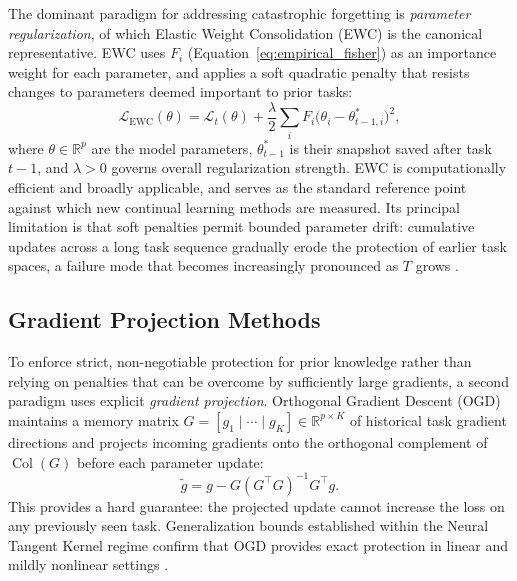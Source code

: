 The dominant paradigm for addressing catastrophic forgetting is
\emph{parameter regularization}, of which Elastic Weight Consolidation (EWC)
\citep{kirkpatrick_overcoming_2017} is the canonical representative.
EWC uses $F_i$ (Equation~\ref{eq:empirical_fisher}) as an importance
weight for each parameter, and applies a soft quadratic penalty that resists
changes to parameters deemed important to prior tasks:
\begin{equation}
\label{eq:ewc}
    \mathcal{L}_{\mathrm{EWC}}(\theta)
    = \mathcal{L}_t(\theta)
    + \frac{\lambda}{2}\sum_i F_i
      \bigl(\theta_i - \theta_{t-1,i}^*\bigr)^2,
\end{equation}
where $\theta \in \mathbb{R}^p$ are the model parameters,
$\theta^*_{t-1}$ is their snapshot saved after task $t{-}1$,
and $\lambda > 0$ governs overall regularization strength.
EWC is computationally efficient and broadly applicable, and serves as the
standard reference point against which new continual learning methods are
measured.
Its principal limitation is that soft penalties permit bounded parameter
drift: cumulative updates across a long task sequence gradually erode the
protection of earlier task spaces, a failure mode that becomes increasingly
pronounced as $T$ grows \citep{de_lange_continual_2022}.

\subsection{Gradient Projection Methods}
\label{sec:rw_projection}

To enforce strict, non-negotiable protection for prior knowledge rather than
relying on penalties that can be overcome by sufficiently large gradients,
a second paradigm uses explicit \emph{gradient projection}.
Orthogonal Gradient Descent (OGD) \citep{farajtabar_orthogonal_2019} maintains
a memory matrix $G = [g_1 \mid \cdots \mid g_K] \in \mathbb{R}^{p \times K}$
of historical task gradient directions and projects incoming gradients onto the
orthogonal complement of $\operatorname{Col}(G)$ before each parameter update:
\begin{equation}
    \tilde{g} = g - G(G^\top G)^{-1}G^\top g.
\end{equation}
This provides a hard guarantee: the projected update cannot increase the loss
on any previously seen task.
Generalization bounds established within the Neural Tangent Kernel regime
confirm that OGD provides exact protection in linear and mildly nonlinear
settings \citep{bennani_generalisation_2020}.

